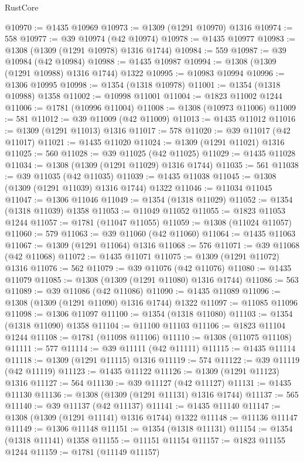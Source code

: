\begin{lexlean}{RustCore}
\begin{coremodule}
@10970 := @1435 @10969
@10973 := @1309 (@1291 @10970) @1316
@10974 := 558
@10977 := @39 @10974 (@42 @10974)
@10978 := @1435 @10977
@10983 := @1308 (@1309 (@1291 @10978) @1316 @1744)
@10984 := 559
@10987 := @39 @10984 (@42 @10984)
@10988 := @1435 @10987
@10994 := @1308 (@1309 (@1291 @10988) @1316 @1744) @1322
@10995 := @10983 @10994
@10996 := @1306 @10995
@10998 := @1354 (@1318 @10978)
@11001 := @1354 (@1318 @10988) @1358
@11002 := @10998 @11001
@11004 := @1823 @11002 @1244
@11006 := @1781 (@10996 @11004)
@11008 := @1308 (@10973 @11006)
@11009 := 581
@11012 := @39 @11009 (@42 @11009)
@11013 := @1435 @11012
@11016 := @1309 (@1291 @11013) @1316
@11017 := 578
@11020 := @39 @11017 (@42 @11017)
@11021 := @1435 @11020
@11024 := @1309 (@1291 @11021) @1316
@11025 := 560
@11028 := @39 @11025 (@42 @11025)
@11029 := @1435 @11028
@11034 := @1308 (@1309 (@1291 @11029) @1316 @1744)
@11035 := 561
@11038 := @39 @11035 (@42 @11035)
@11039 := @1435 @11038
@11045 := @1308 (@1309 (@1291 @11039) @1316 @1744) @1322
@11046 := @11034 @11045
@11047 := @1306 @11046
@11049 := @1354 (@1318 @11029)
@11052 := @1354 (@1318 @11039) @1358
@11053 := @11049 @11052
@11055 := @1823 @11053 @1244
@11057 := @1781 (@11047 @11055)
@11059 := @1308 (@11024 @11057)
@11060 := 579
@11063 := @39 @11060 (@42 @11060)
@11064 := @1435 @11063
@11067 := @1309 (@1291 @11064) @1316
@11068 := 576
@11071 := @39 @11068 (@42 @11068)
@11072 := @1435 @11071
@11075 := @1309 (@1291 @11072) @1316
@11076 := 562
@11079 := @39 @11076 (@42 @11076)
@11080 := @1435 @11079
@11085 := @1308 (@1309 (@1291 @11080) @1316 @1744)
@11086 := 563
@11089 := @39 @11086 (@42 @11086)
@11090 := @1435 @11089
@11096 := @1308 (@1309 (@1291 @11090) @1316 @1744) @1322
@11097 := @11085 @11096
@11098 := @1306 @11097
@11100 := @1354 (@1318 @11080)
@11103 := @1354 (@1318 @11090) @1358
@11104 := @11100 @11103
@11106 := @1823 @11104 @1244
@11108 := @1781 (@11098 @11106)
@11110 := @1308 (@11075 @11108)
@11111 := 577
@11114 := @39 @11111 (@42 @11111)
@11115 := @1435 @11114
@11118 := @1309 (@1291 @11115) @1316
@11119 := 574
@11122 := @39 @11119 (@42 @11119)
@11123 := @1435 @11122
@11126 := @1309 (@1291 @11123) @1316
@11127 := 564
@11130 := @39 @11127 (@42 @11127)
@11131 := @1435 @11130
@11136 := @1308 (@1309 (@1291 @11131) @1316 @1744)
@11137 := 565
@11140 := @39 @11137 (@42 @11137)
@11141 := @1435 @11140
@11147 := @1308 (@1309 (@1291 @11141) @1316 @1744) @1322
@11148 := @11136 @11147
@11149 := @1306 @11148
@11151 := @1354 (@1318 @11131)
@11154 := @1354 (@1318 @11141) @1358
@11155 := @11151 @11154
@11157 := @1823 @11155 @1244
@11159 := @1781 (@11149 @11157)

\end{coremodule}
\end{lexlean}
